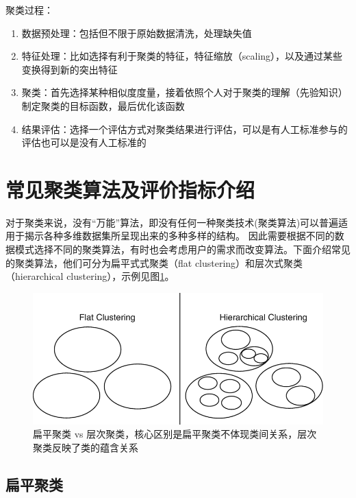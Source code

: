聚类过程：
\begin{enumerate}
    \item 数据预处理：包括但不限于原始数据清洗，处理缺失值 
    \item 特征处理：比如选择有利于聚类的特征，特征缩放（scaling），以及通过某些变换得到新的突出特征
    \item 聚类：首先选择某种相似度度量，接着依照个人对于聚类的理解（先验知识）制定聚类的目标函数，最后优化该函数
    \item 结果评估：选择一个评估方式对聚类结果进行评估，可以是有人工标准参与的评估也可以是没有人工标准的
\end{enumerate} 


\section{常见聚类算法及评价指标介绍}
对于聚类来说，没有“万能”算法，即没有任何一种聚类技术(聚类算法)可以普遍适用于揭示各种多维数据集所呈现出来的多种多样的结构。
因此需要根据不同的数据模式选择不同的聚类算法，有时也会考虑用户的需求而改变算法。下面介绍常见的聚类算法，他们可分为扁平式式聚类（flat clustering）和层次式聚类（hierarchical clustering），示例见图\ref{fig: cluster_taxonomy}。

\begin{figure}[h]
    \includegraphics[scale=.4]{pic/394318_1_En_9_Fig6_HTML.png}
    \caption{扁平聚类 vs 层次聚类，核心区别是扁平聚类不体现类间关系，层次聚类反映了类的蕴含关系}
    \label{fig: cluster_taxonomy}
\end{figure}

\subsection{扁平聚类}

